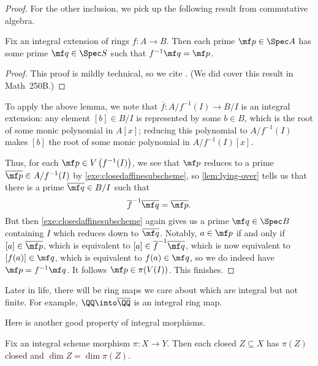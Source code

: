 \documentclass[../notes.tex]{subfiles}
\begin{document}
\begin{proof}
	For the other inclusion, we pick up the following result from commutative algebra.
	\begin{lemma} \label{lem:lying-over}
		Fix an integral extension of rings $f\colon A\to B$. Then each prime $\mf p\in\Spec A$ has some prime $\mf q\in\Spec S$ such that $f^{-1}\mf q=\mf p$.
	\end{lemma}
	\begin{proof}
		This proof is mildly technical, so we cite \cite[\S4.4]{eisenbud-comm-alg}. (We did cover this result in Math~250B.)
	\end{proof}
	To apply the above lemma, we note that $\overline f\colon A/f^{-1}(I)\to B/I$ is an integral extension: any element $[b]\in B/I$ is represented by some $b\in B$, which is the root of some monic polynomial in $A[x]$; reducing this polynomial to $A/f^{-1}(I)$ makes $[b]$ the root of some monic polynomial in $A/f^{-1}(I)[x]$.

	Thus, for each $\mf p\in V\left(f^{-1}(I)\right)$, we see that $\mf p$ reduces to a prime $\overline{\mf p}\in A/f^{-1}(I)$ by \autoref{exe:closedaffinesubscheme}, so \autoref{lem:lying-over} tells us that there is a prime $\overline{\mf q}\in B/I$ such that
	\[\overline f^{-1}\overline{\mf q}=\overline{\mf p}.\]
	But then \autoref{exe:closedaffinesubscheme} again gives us a prime $\mf q\in\Spec B$ containing $I$ which reduces down to $\overline{\mf q}$. Notably, $a\in\mf p$ if and only if $[a]\in\overline{\mf p}$, which is equivalent to $[a]\in\overline f^{-1}\overline{\mf q}$, which is now equivalent to $[f(a)]\in\mf q$, which is equivalent to $f(a)\in\mf q$, so we do indeed have $\mf p=f^{-1}\mf q$. It follows $\mf p\in\pi(V(I))$. This finishes.
\end{proof}
\begin{remark}
	Later in life, there will be ring maps we care about which are integral but not finite. For example, $\QQ\into\overline\QQ$ is an integral ring map.
\end{remark}
Here is another good property of integral morphisms.
\begin{prop}
	Fix an integral scheme morphism $\pi\colon X\to Y$. Then each closed $Z\subseteq X$ has $\pi(Z)$ closed and $\dim Z=\dim\pi(Z)$.
\end{prop}
\end{document}
